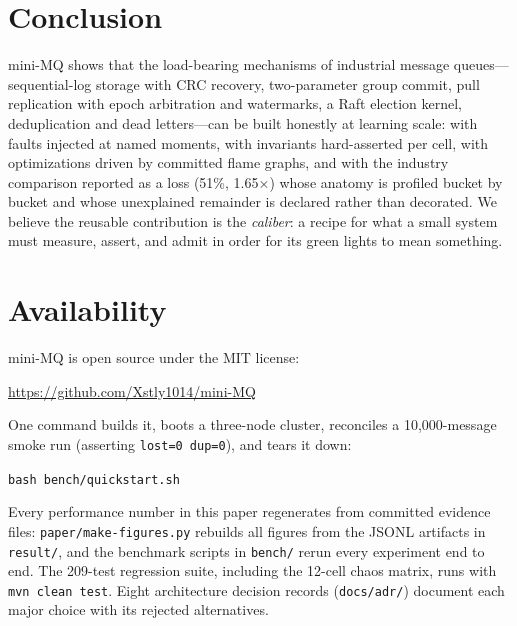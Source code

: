\documentclass[letterpaper,twocolumn,10pt]{article}
\begin{document}
\section{Conclusion}
mini-MQ shows that the load-bearing mechanisms of industrial message
queues---sequential-log storage with CRC recovery, two-parameter group
commit, pull replication with epoch arbitration and watermarks, a Raft
election kernel, deduplication and dead letters---can be built
honestly at learning scale: with faults injected at named moments, with
invariants hard-asserted per cell, with optimizations driven by
committed flame graphs, and with the industry comparison reported as a
loss (51\%, 1.65$\times$) whose anatomy is profiled bucket by bucket
and whose unexplained remainder is declared rather than decorated. We
believe the reusable contribution is the \emph{caliber}: a recipe for
what a small system must measure, assert, and admit in order for its
green lights to mean something.

\section*{Availability}
\label{sec:availability}
mini-MQ is open source under the MIT license:
\begin{center}
\url{https://github.com/Xstly1014/mini-MQ}
\end{center}
One command builds it, boots a three-node cluster, reconciles a
10{,}000-message smoke run (asserting \texttt{lost=0 dup=0}), and tears
it down:
\begin{center}
\texttt{bash bench/quickstart.sh}
\end{center}
Every performance number in this paper regenerates from committed
evidence files: \texttt{paper/make-figures.py} rebuilds all figures
from the JSONL artifacts in \texttt{result/}, and the benchmark scripts
in \texttt{bench/} rerun every experiment end to end. The 209-test
regression suite, including the 12-cell chaos matrix, runs with
\texttt{mvn clean test}. Eight architecture decision records
(\texttt{docs/adr/}) document each major choice with its rejected
alternatives.




\end{document}

